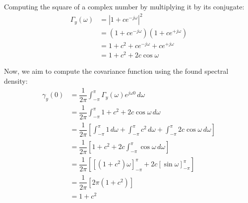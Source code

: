 \begin{example}
    Computing the square of a complex number by multiplying it by its conjugate:
    \begin{align*}
        \Gamma_y(\omega)    &=\left\lvert 1+ce^{-j\omega}\right\rvert^2 \\
                            &=\left(1+ce^{-j\omega}\right)\left(1+ce^{+j\omega}\right) \\
                            &=1+c^2+ce^{-j\omega}+ce^{+j\omega} \\
                            &=1+c^2 + 2c\cos\omega
    \end{align*}

    Now, we aim to compute the covariance function using the found spectral density:
    \begin{align*}
        \gamma_y(0)     &=\dfrac{1}{2\pi}\int_{-\pi}^{\pi}\Gamma_y(\omega)e^{j\omega 0}\,d\omega \\
                        &=\dfrac{1}{2\pi}\int_{-\pi}^{\pi}1+c^2 + 2c\cos\omega\,d\omega \\
                        &=\dfrac{1}{2\pi}\left[\int_{-\pi}^{\pi}1\,d\omega+\int_{-\pi}^{\pi}c^2\,d\omega + \int_{-\pi}^{\pi}2c\cos\omega\,d\omega\right] \\
                        &=\dfrac{1}{2\pi}\left[1+c^2 + 2c\int_{-\pi}^{\pi}\cos\omega\,d\omega\right] \\                     
                        &=\dfrac{1}{2\pi}\left[\left[\left(1+c^2\right)\omega\right]_{-\pi}^{\pi} + 2c\left[\sin\omega\right]_{-\pi}^{\pi}\right] \\ 
                        &=\dfrac{1}{2\pi}\left[2\pi\left(1+c^2\right)\right] \\       
                        &=1+c^2              
    \end{align*}    
\end{example}